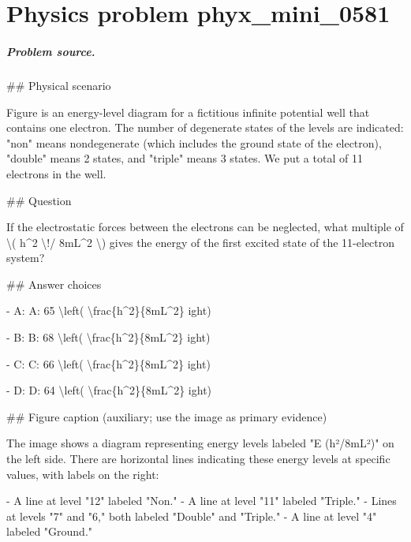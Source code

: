 
\chapter{Physics problem phyx\_mini\_0581}
\label{ch:PhyXMiniProblems_problem_phyx_mini_0581}

\paragraph{Problem source.}
\#\# Physical scenario

Figure is an energy-level diagram for a fictitious infinite potential well that contains one electron. The number of degenerate states of the levels are indicated: "non" means nondegenerate (which includes the ground state of the electron), "double" means 2 states, and "triple" means 3 states. We put a total of 11 electrons in the well.

\#\# Question

If the electrostatic forces between the electrons can be neglected, what multiple of \textbackslash{}( h\textasciicircum{}2 \textbackslash{}!/ 8mL\textasciicircum{}2 \textbackslash{}) gives the energy of the first excited state of the 11-electron system?

\#\# Answer choices

- A: A: 65 \textbackslash{}left( \textbackslash{}frac\{h\textasciicircum{}2\}\{8mL\textasciicircum{}2\} 
ight)

- B: B: 68 \textbackslash{}left( \textbackslash{}frac\{h\textasciicircum{}2\}\{8mL\textasciicircum{}2\} 
ight)

- C: C: 66 \textbackslash{}left( \textbackslash{}frac\{h\textasciicircum{}2\}\{8mL\textasciicircum{}2\} 
ight)

- D: D: 64 \textbackslash{}left( \textbackslash{}frac\{h\textasciicircum{}2\}\{8mL\textasciicircum{}2\} 
ight)

\#\# Figure caption (auxiliary; use the image as primary evidence)

The image shows a diagram representing energy levels labeled "E (h²/8mL²)" on the left side. There are horizontal lines indicating these energy levels at specific values, with labels on the right:

- A line at level "12" labeled "Non."
- A line at level "11" labeled "Triple."
- Lines at levels "7" and "6," both labeled "Double" and "Triple."
- A line at level "4" labeled "Ground."

